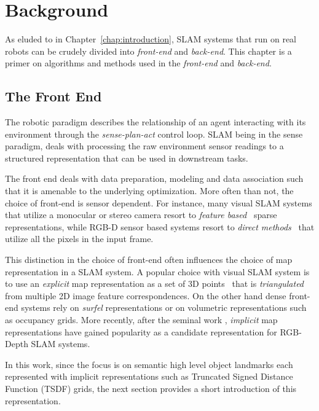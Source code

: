 \chapter{Background} \label{chap:background}

As eluded to in Chapter~\ref{chap:introduction}, SLAM systems that run on real robots can be crudely divided into \emph{front-end} and \emph{back-end}. This chapter is a primer on algorithms and methods used in the \emph{front-end} and \emph{back-end}.

\section{The Front End}

The robotic paradigm describes the relationship of an agent interacting with its environment through the \emph{sense-plan-act} control loop. SLAM being in the sense paradigm, deals with processing the raw environment sensor readings to a structured representation that can be used in downstream tasks.

The front end deals with data preparation, modeling and data association such that it is amenable to the underlying optimization. More often than not, the choice of front-end is sensor dependent. For instance, many visual SLAM systems that utilize a monocular or stereo camera resort to \emph{feature based}~\cite{qinVINSMonoRobustVersatile2018, loiannoVisualInertialOdometry2016} sparse representations, while RGB-D sensor based systems resort to \emph{direct methods}~\cite{newcombeKinectFusionRealtimeDense2011, whelanElasticFusionDenseSLAM2015} that utilize all the pixels in the input frame.

This distinction in the choice of front-end often influences the choice of map representation in a SLAM system. A popular choice with visual SLAM system is to use an \emph{explicit} map representation as a set of 3D points~\cite{mur-artalORBSLAM2OpenSourceSLAM2017} that is \emph{triangulated} from multiple 2D image feature correspondences. On the other hand dense front-end systems rely on \emph{surfel} representations or on volumetric representations such as occupancy grids. More recently, after the seminal work \cite{newcombeKinectFusionRealtimeDense2011}, \emph{implicit} map representations have gained popularity as a candidate representation for RGB-Depth SLAM systems.

In this work, since the focus is on semantic high level object landmarks each represented with implicit representations such as Truncated Signed Distance Function (TSDF) grids, the next section provides a short introduction of this representation.

